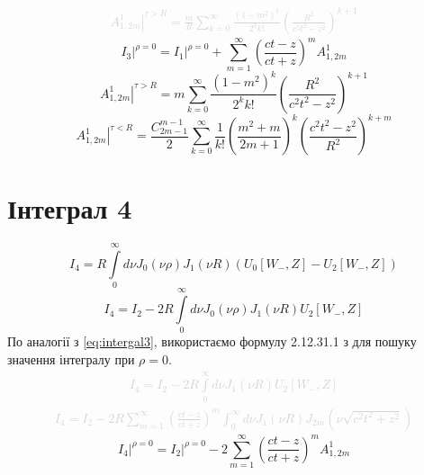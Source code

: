 %
\textcolor{lightgray}{ \begin{equation*} \begin{aligned}
\left. A_{1,2m}^1 \right|^{\tau > R} = \frac{m}{R}
\sum_{k=0}^\infty  \frac{\left( 1-m^2 \right)^k}{2^k k!} 
\left( \frac{R^2}{c^2t^2-z^2} \right)^{k+1}
\end{aligned} \end{equation*} }
%
\begin{equation}
\left. I_3 \right|^{\rho=0} = \left. I_1 \right|^{\rho=0} +
\sum_{m=1}^{\infty} \left( \frac{ct - z}{ct + z} \right)^m A_{1,2m}^1
\end{equation}
%
\begin{equation}
\left. A_{1,2m}^1 \right|^{\tau > R} = m
\sum_{k=0}^\infty  \frac{\left( 1-m^2 \right)^k}{2^k k!} 
\left( \frac{R^2}{c^2t^2-z^2} \right)^{k+1}
\end{equation}
%
\begin{equation} 
\left. A_{1,2m}^1 \right|^{\tau < R} = \frac{C_{2m-1}^{m-1}}{2}
\sum_{k=0}^\infty \frac{1}{k!} \left( \frac{m^2+m}{2m+1} \right)^k
\left( \frac{c^2t^2-z^2}{R^2} \right)^{k+m}
\end{equation}

\section{Інтеграл 4}

\begin{equation}
I_4 = R \int \limits_{0}^{\infty} d \nu J_0(\nu \rho) J_1(\nu R) 
(U_0[ W_-, Z ] - U_2[ W_-, Z ])
\end{equation}
%
\begin{equation}
I_4 = I_2 - 2 R \int \limits_{0}^{\infty} d \nu 
J_0(\nu \rho) J_1(\nu R) U_2[ W_-, Z ]
\end{equation}
%
По аналогії з \eqref{eq:intergal3}, використаємо формулу 2.12.31.1 з 
\cite[ст. 209]{SpecFunc1983} для пошуку значення інтегралу при $ \rho = 0 $.
%
\textcolor{lightgray}{ \begin{equation*} \begin{aligned}
I_4 = I_2 - 2 R \int \limits_{0}^{\infty} d \nu J_1(\nu R) U_2[ W_-, Z ]
\end{aligned} \end{equation*} }
%
\textcolor{lightgray}{ \begin{equation*} \begin{aligned}
I_4 = I_2 - 2 R \sum_{m=1}^{\infty} \left( \frac{ct - z}{ct + z} \right)^m 
\int_{0}^{\infty} d \nu J_1(\nu R) J_{2m} (\nu \sqrt{c^2t^2 + z^2})
\end{aligned} \end{equation*} }
%
\begin{equation}
\left. I_4 \right|^{\rho=0} = \left. I_2 \right|^{\rho=0} -
2 \sum_{m=1}^{\infty} \left( \frac{ct - z}{ct + z} \right)^m A_{1,2m}^1
\end{equation}


